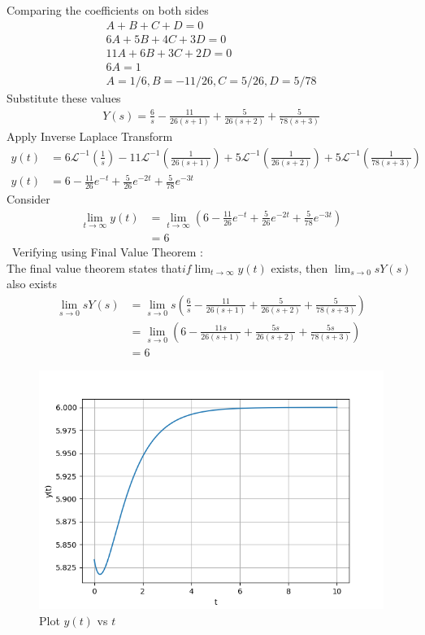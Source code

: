 \documentclass[journal,12pt,onecolumn]{IEEEtran}
\theoremstyle{remark}
\renewcommand{\brak}[1]{\left(#1\right)}
\begin{document}
Comparing the coefficients on both sides \\
\begin{align}
A + B + C + D = 0 \\
6A + 5B + 4C + 3D = 0 \\
11A + 6B + 3C + 2D = 0 \\
6A = 1 \\
A=1/6 ,B = -11/26 , C= 5/26 , D= 5/78 
\end{align}
Substitute these values 
\begin{align}
Y(s) = \frac{6}{s} - \frac{11}{26\brak{s+1}} + \frac{5}{26\brak{s+2}} + \frac{5}{78\brak{s+3}}
\end{align}
Apply Inverse Laplace Transform 
\begin{align}
y(t) &= 6\mathcal{L}^{-1}\brak{\frac{1}{s}} - 11\mathcal{L}^{-1}\brak{\frac{1}{26(s+1)}} + 5\mathcal{L}^{-1}\brak{\frac{1}{26(s+2)}} + 5\mathcal{L}^{-1}\brak{\frac{1}{78(s+3)}} \\
y(t) &= 6 - \frac{11}{26}e^{-t} + \frac{5}{26}e^{-2t} +\frac{5}{78}e^{-3t}
\end{align}
Consider
\begin{align}
\lim_{t \to \infty} y(t) &= \lim_{t \to \infty} \brak{6 - \frac{11}{26}e^{-t} + \frac{5}{26}e^{-2t} +\frac{5}{78}e^{-3t}} \\
&= 6
\end{align}\
Verifying using Final Value Theorem :\\
The final value theorem states that$ if \lim_{t \to \infty} y(t) $ exists, then  $\lim_{s \to 0} sY(s)$  also exists
\begin{align}
\lim_{s \to 0} sY(s) &= \lim_{s \to 0} s \left( \frac{6}{s} - \frac{11}{26(s+1)} + \frac{5}{26(s+2)} + \frac{5}{78(s+3)} \right) \\
&= \lim_{s \to 0} \brak{ 6 - \frac{11s}{26(s+1)} + \frac{5s}{26(s+2)} + \frac{5s}{78(s+3)}} \\
&= 6
\end{align}

\begin{figure}[h!]
\centering
\includegraphics[width=\columnwidth]{figs/plot.png}
\caption{Plot $y(t)$ vs $t$ }
\end{figure}
\end{document}
